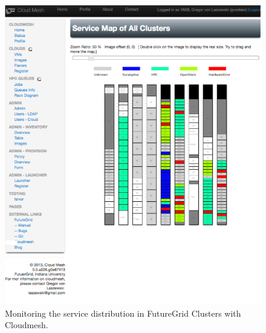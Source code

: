 \documentclass{tex/sig-alternate-2013}
\begin{document}
\begin{figure}[p]
  \centering
    \includegraphics[width=1.0\columnwidth]{images/rainbow.pdf}
  \caption{Monitoring the service distribution in FutureGrid Clusters with Cloudmesh.}


\end{figure}
\end{document}
